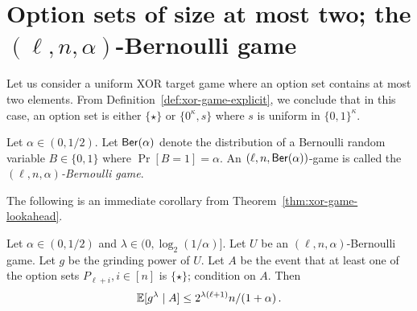 
\section{Option sets of size at most two\texorpdfstring{; the $(\ell, n, \alpha)$-Bernoulli game}{}}

    Let us consider a uniform XOR target game where an option set 
    contains at most two elements. 
    From Definition~\ref{def:xor-game-explicit}, 
    we conclude that in this case, 
    an option set is either $\{\star\}$ 
    or $\{0^\kappa, s\}$ where $s$ is uniform in $\{0,1\}^\kappa$.


    \begin{definition}
        \label{def:static-game}\label{def:Bernoulli-game}
        Let $\alpha \in (0, 1/2)$. 
        Let $\mathsf{Ber}(\alpha)$ denote the distribution of a Bernoulli random variable 
        $B \in \{0,1\}$ where $\Pr[B = 1] = \alpha$.
        An $(\ell, n, \mathsf{Ber}(\alpha))$-game 
        is called the \emph{$(\ell, n, \alpha)$-Bernoulli game}.
    \end{definition}
    The following is an immediate corollary from Theorem~\ref{thm:xor-game-lookahead}.

    \begin{theorem}\label{thm:xor-game-playornot}
        Let $\alpha \in (0, 1/2)$ and $\lambda \in (0, \log_2(1/\alpha)]$. 
        Let $U$ be an $(\ell, n, \alpha)$-Bernoulli game. 
        Let $g$ be the grinding power of $U$. 
        Let $A$ be the event that 
        at least one of the option sets $P_{\ell + i}, i \in [n]$ is $\{\star\}$; 
        condition on $A$. 
        Then 
        $$
            \operatorname{\mathbb{E}} [g^\lambda \mid A] \leq 2^{\lambda(\ell + 1)} n/(1+\alpha)
            \,.
        $$
    \end{theorem}

